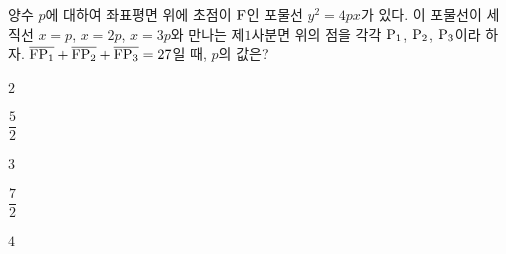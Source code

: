 양수 $p$에 대하여 좌표평면 위에 초점이 $\mathrm{F}$인 포물선 $y^2=4px$가 있다. 이 포물선이 세 직선 $x=p$, $x=2p$, $x=3p$와 만나는 제$1$사분면 위의 점을 각각 $\mathrm{P_1}$, $\mathrm{P_2}$, $\mathrm{P_3}$이라 하자. $\overline{\mathrm{FP_1}}+\overline{\mathrm{FP_2}}+\overline{\mathrm{FP_3}}=27$일 때, $p$의 값은?
\begin{choices32}{\rule[-3ex]{0pt}{8ex}$2$}{\rule[-3ex]{0pt}{8ex}$\dfrac{5}{2}$}{\rule[-3ex]{0pt}{8ex}$3$}{\rule[-3ex]{0pt}{8ex}$\dfrac{7}{2}$}{\rule[-3ex]{0pt}{8ex}$4$}\end{choices32}
